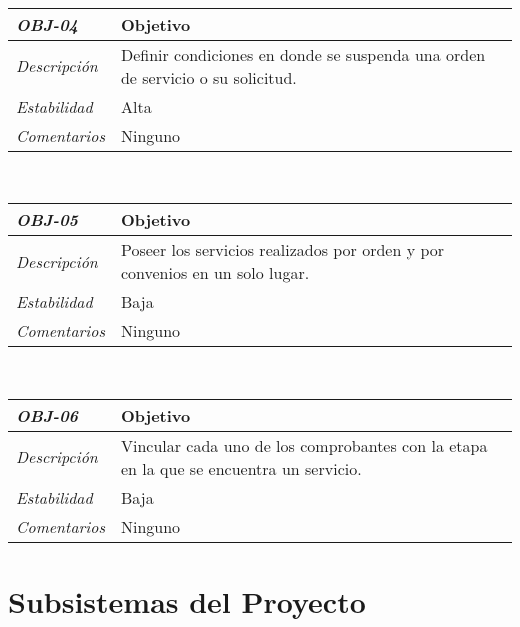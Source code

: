 \begin{center}
\begin{tabular}{ | p{4.5cm} | p{11cm} | }
	\hline
\end{tabular} \\[1cm]
\begin{tabular}{ | p{4.5cm} | p{11cm} | }
	\hline
	\rowcolor{lightgray}
	\hfil \textbf{\textit{OBJ-04}} &
	\hfil \textbf{Objetivo}  \\
	\hline
	\raggedleft \textit{Descripci\'on} &
	Definir condiciones en donde se
	suspenda una orden de servicio o su
	solicitud. \\
	\hline
	\raggedleft \textit{Estabilidad} & Alta \\
	\hline
	\raggedleft \textit{Comentarios} & Ninguno \\
	\hline
\end{tabular} \\[1cm]
\begin{tabular}{ | p{4.5cm} | p{11cm} | }
	\hline
	\rowcolor{lightgray}
	\hfil \textbf{\textit{OBJ-05}} &
	\hfil \textbf{Objetivo}  \\
	\hline
	\raggedleft \textit{Descripci\'on} &
	Poseer los servicios realizados
	por orden y por convenios en un solo
	lugar. \\
	\hline
	\raggedleft \textit{Estabilidad} & Baja \\
	\hline
	\raggedleft \textit{Comentarios} & Ninguno \\
	\hline
\end{tabular} \\[1cm]
\begin{tabular}{ | p{4.5cm} | p{11cm} | }
	\hline
	\rowcolor{lightgray}
	\hfil \textbf{\textit{OBJ-06}} &
	\hfil \textbf{Objetivo}  \\
	\hline
	\raggedleft \textit{Descripci\'on} &
	Vincular cada uno de los comprobantes
	con la etapa en la que se encuentra
	un servicio. \\
	\hline
	\raggedleft \textit{Estabilidad} & Baja \\
	\hline
	\raggedleft \textit{Comentarios} & Ninguno \\
	\hline
\end{tabular}
\end{center}
\section{Subsistemas del Proyecto}
